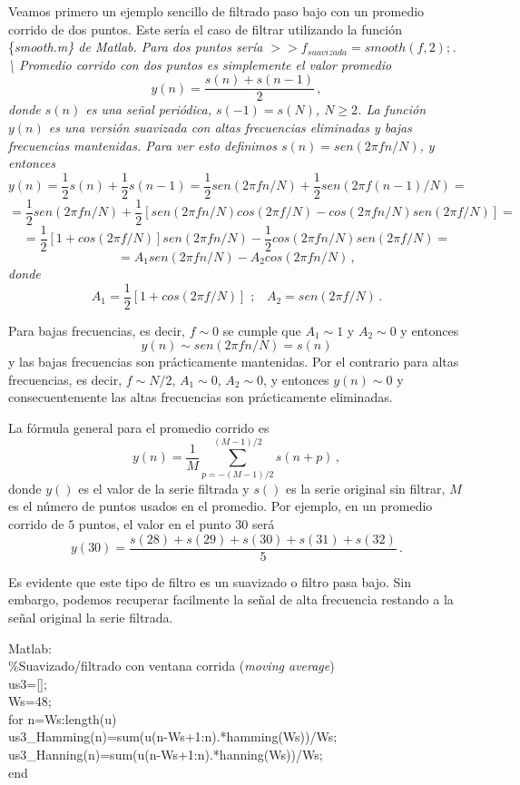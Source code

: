 \documentclass[
]{agujournal2019}
\begin{document}
Veamos primero un ejemplo sencillo de filtrado paso bajo con un promedio
corrido de dos puntos. Este sería el caso de filtrar utilizando la
función \{\it smooth.m\} de Matlab. Para dos puntos sería
\(>> f_{suavizada}=smooth(f,2);\). \textbackslash{} Promedio corrido con
dos puntos es simplemente el valor promedio
\[y(n)=\frac{s(n) + s(n-1)}{2}\,,\] donde \(s(n)\) es una señal
periódica, \(s(-1)=s(N)\), \(N\ge 2\). La función \(y(n)\) es una
versión suavizada con altas frecuencias eliminadas y bajas frecuencias
mantenidas. Para ver esto definimos \(s(n)=sen(2\pi f n/N)\), y entonces
\[y(n)=\frac{1}{2} s(n) + \frac{1}{2} s(n-1)=\frac{1}{2} sen(2\pi f n/N) + \frac{1}{2} sen(2\pi f (n-1)/N)=\]
\[=\frac{1}{2}sen(2\pi f n/N) + \frac{1}{2}\left[ sen(2\pi f n/N)cos(2\pi f/N) - cos(2\pi f n/N)sen(2\pi f/N)\right]=\]
\[=\frac{1}{2}\left[ 1+cos(2\pi f/N)\right]sen(2\pi f n/N) - \frac{1}{2} cos(2\pi f n/N)sen(2\pi f/N)=\]
\[=A_1sen(2\pi f n/N) - A_2cos(2\pi f n/N)\,,\] donde
\[A_1=\frac{1}{2}\left[ 1+cos(2\pi f/N)\right]\,\,;\,\,\,\,\,A_2=sen(2\pi f/N)\,.\]

Para bajas frecuencias, es decir, \(f\sim 0\) se cumple que
\(A_1\sim 1\) y \(A_2 \sim 0\) y entonces
\[y(n)\sim sen(2\pi f n/N)=s(n)\] y las bajas frecuencias son
prácticamente mantenidas. Por el contrario para altas frecuencias, es
decir, \(f\sim N/2\), \(A_1\sim 0\), \(A_2\sim0\), y entonces
\(y(n)\sim0\) y consecuentemente las altas frecuencias son prácticamente
eliminadas.

La fórmula general para el promedio corrido es
\[y(n)=\frac{1}{M}\sum\limits^{(M-1)/2}_{p=-(M-1)/2} s(n+p)\,,\] donde
\(y( )\) es el valor de la serie filtrada y \(s( )\) es la serie
original sin filtrar, \(M\) es el número de puntos usados en el
promedio. Por ejemplo, en un promedio corrido de \(5\) puntos, el valor
en el punto \(30\) será
\[y(30)=\frac{s(28)+s(29)+s(30)+s(31)+s(32)}{5}\,.\]

Es evidente que este tipo de filtro es un suavizado o filtro pasa bajo.
Sin embargo, podemos recuperar facilmente la señal de alta frecuencia
restando a la señal original la serie filtrada.

\begin{framed}
{\textbf \noindent Matlab}:
\\
\%Suavizado/filtrado con ventana corrida ({\it moving average})\\
us3=[];\\
Ws=48;\\
for n=Ws:length(u)\\
    us3\_Hamming(n)=sum(u(n-Ws+1:n).*hamming(Ws))/Ws;\\
    us3\_Hanning(n)=sum(u(n-Ws+1:n).*hanning(Ws))/Ws;\\
end\\

\end{framed}
\end{document}

